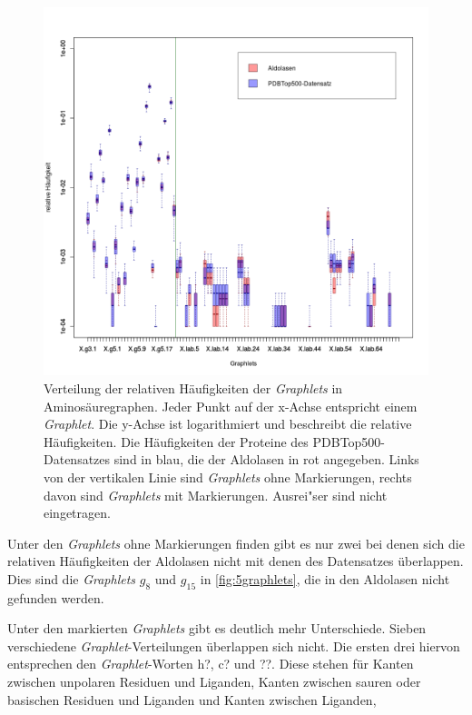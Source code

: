 \documentclass{report}
\begin{document}
\begin{figure}
\label{fig:aaplot}
\includegraphics[scale=0.55]{aa_plot.png}
\caption{Verteilung der relativen H\"aufigkeiten der \textit{Graphlets} in Aminos\"auregraphen. Jeder Punkt auf der x-Achse entspricht einem \textit{Graphlet}. Die y-Achse ist logarithmiert und beschreibt die relative H\"aufigkeiten. Die H\"aufigkeiten der Proteine des PDBTop500-Datensatzes sind in blau, die der Aldolasen in rot angegeben. Links von der vertikalen Linie sind \textit{Graphlets} ohne Markierungen, rechts davon sind \textit{Graphlets} mit Markierungen. Ausrei"ser sind nicht eingetragen.}

\end{figure}




Unter den \textit{Graphlets} ohne Markierungen finden gibt es nur zwei bei denen sich die relativen H\"aufigkeiten der Aldolasen nicht mit denen des Datensatzes \"uberlappen. Dies sind die \textit{Graphlets} $g_8$ und $g_{15}$ in \ref{fig:5graphlets}, die in den Aldolasen nicht gefunden werden.


Unter den markierten \textit{Graphlets} gibt es deutlich mehr Unterschiede. Sieben verschiedene \textit{Graphlet}-Verteilungen \"uberlappen sich nicht. Die ersten drei hiervon entsprechen den \textit{Graphlet}-Worten h?, c? und ??. Diese stehen f\"ur Kanten zwischen unpolaren Residuen und Liganden, Kanten zwischen sauren oder basischen Residuen und Liganden und Kanten zwischen Liganden,
\end{document}

